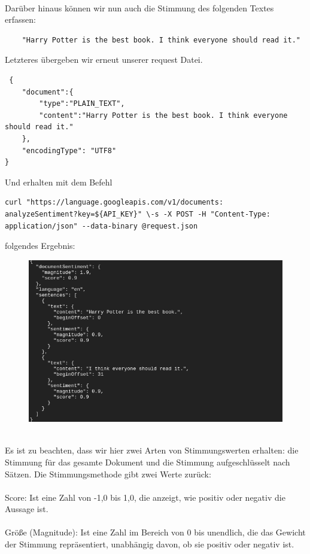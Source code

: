 \documentclass[12pt,a4paper]{article}
\begin{document}
\ \\
Darüber hinaus können wir nun auch die Stimmung des folgenden Textes erfassen:
\begin{verbatim}
	"Harry Potter is the best book. I think everyone should read it."
\end{verbatim}
Letzteres übergeben wir erneut unserer request Datei.
\begin{verbatim}
 {
	"document":{
		"type":"PLAIN_TEXT",
		"content":"Harry Potter is the best book. I think everyone should read it."
	},
	"encodingType": "UTF8"
}
\end{verbatim}
Und erhalten mit dem Befehl
\begin{verbatim}
curl "https://language.googleapis.com/v1/documents:
analyzeSentiment?key=${API_KEY}" \-s -X POST -H "Content-Type: 
application/json" --data-binary @request.json
\end{verbatim}
folgendes Ergebnis:
\newpage
\begin{figure}[h!]
	\centering
	\includegraphics[width=0.9\linewidth]{../images/sentiment}
	\label{fig:sentiment}
\end{figure}
\ \\
Es ist zu beachten, dass wir hier zwei Arten von Stimmungswerten erhalten: die Stimmung für das gesamte Dokument und die Stimmung aufgeschlüsselt nach Sätzen. Die Stimmungsmethode gibt zwei Werte zurück:
\\ \\
Score: Ist eine Zahl von -1,0 bis 1,0, die anzeigt, wie positiv oder negativ die Aussage ist.
\\ \\
Größe (Magnitude): Ist eine Zahl im Bereich von 0 bis unendlich, die das Gewicht der Stimmung repräsentiert, unabhängig davon, ob sie positiv oder negativ ist.










\newpage
\thispagestyle{empty}
\printbibliography
\end{document}
